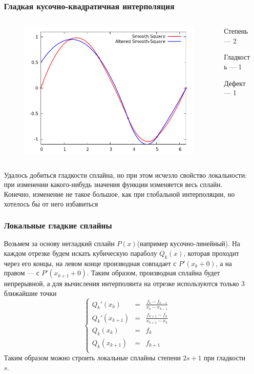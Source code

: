 \documentclass[aspectratio=43,unicode]{beamer}
\begin{document}
\begin{frame}
\frametitle{Гладкая кусочно-квадратичная интерполяция}
	\begin{columns}[c]
	\begin{column}{0.6\textwidth}
	\begin{figure}
	\center
	\includegraphics[width=\textwidth]{spline2_1.png}%
	\end{figure}
	\end{column}
	\begin{column}{0.4\textwidth}
	Степень --- 2

	Гладкость --- 1

	Дефект --- 1
	\end{column}
	\end{columns}

	Удалось добиться гладкости сплайна, но при этом исчезло свойство локальности:
	при изменении какого-нибудь значения функции изменяется весь сплайн. Конечно, изменение не такое
	большое, как при глобальной интерполяции, но хотелось бы от него избавиться
\end{frame}

\begin{frame}
\frametitle{Локальные гладкие сплайны}
	Возьмем за основу негладкий сплайн $P(x)$(например кусочно-линейный).
	На каждом отрезке будем искать кубическую параболу $Q_k(x)$, которая проходит через его концы,
	на левом конце производная совпадает с $P'(x_k+0)$, а на правом --- с $P'(x_{k+1}+0)$.
	Таким образом, производная сплайна будет непрерывной, а для вычисления интерполянта на
	отрезке используются только 3 ближайшие точки
	$$
	\left\{
	\begin{array}{lcl}
		Q_k'(x_k) &=& \frac{f_{k}-f_{k-1}}{x_k-x_{k-1}}\\
		Q_k'(x_{k+1}) &=& \frac{f_{k+1}-f_{k}}{x_{k+1}-x_{k}}\\
		Q_k(x_k) &=& f_k\\
		Q_k(x_{k+1}) &=& f_{k+1}\\
	\end{array}
	\right.
	$$
	Таким образом можно строить локальные сплайны степени $2s+1$ при гладкости $s$.
\end{frame}
\end{document}
